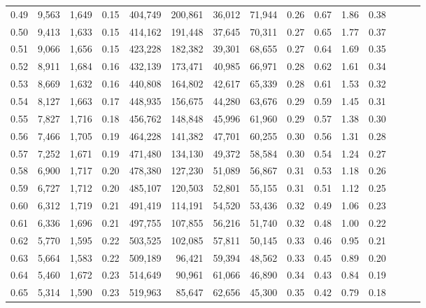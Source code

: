 \begin{tabular}{rrrrrrrrrrrrrrr}
0.49 &   9,563 &  1,649 &  0.15 &  404,749 &  200,861 &   36,012 &   71,944 &  0.26 &  0.67 &  1.86 &      0.38 \\
0.50 &   9,413 &  1,633 &  0.15 &  414,162 &  191,448 &   37,645 &   70,311 &  0.27 &  0.65 &  1.77 &      0.37 \\
0.51 &   9,066 &  1,656 &  0.15 &  423,228 &  182,382 &   39,301 &   68,655 &  0.27 &  0.64 &  1.69 &      0.35 \\
0.52 &   8,911 &  1,684 &  0.16 &  432,139 &  173,471 &   40,985 &   66,971 &  0.28 &  0.62 &  1.61 &      0.34 \\
0.53 &   8,669 &  1,632 &  0.16 &  440,808 &  164,802 &   42,617 &   65,339 &  0.28 &  0.61 &  1.53 &      0.32 \\
0.54 &   8,127 &  1,663 &  0.17 &  448,935 &  156,675 &   44,280 &   63,676 &  0.29 &  0.59 &  1.45 &      0.31 \\
0.55 &   7,827 &  1,716 &  0.18 &  456,762 &  148,848 &   45,996 &   61,960 &  0.29 &  0.57 &  1.38 &      0.30 \\
0.56 &   7,466 &  1,705 &  0.19 &  464,228 &  141,382 &   47,701 &   60,255 &  0.30 &  0.56 &  1.31 &      0.28 \\
0.57 &   7,252 &  1,671 &  0.19 &  471,480 &  134,130 &   49,372 &   58,584 &  0.30 &  0.54 &  1.24 &      0.27 \\
0.58 &   6,900 &  1,717 &  0.20 &  478,380 &  127,230 &   51,089 &   56,867 &  0.31 &  0.53 &  1.18 &      0.26 \\
0.59 &   6,727 &  1,712 &  0.20 &  485,107 &  120,503 &   52,801 &   55,155 &  0.31 &  0.51 &  1.12 &      0.25 \\
0.60 &   6,312 &  1,719 &  0.21 &  491,419 &  114,191 &   54,520 &   53,436 &  0.32 &  0.49 &  1.06 &      0.23 \\
0.61 &   6,336 &  1,696 &  0.21 &  497,755 &  107,855 &   56,216 &   51,740 &  0.32 &  0.48 &  1.00 &      0.22 \\
0.62 &   5,770 &  1,595 &  0.22 &  503,525 &  102,085 &   57,811 &   50,145 &  0.33 &  0.46 &  0.95 &      0.21 \\
0.63 &   5,664 &  1,583 &  0.22 &  509,189 &   96,421 &   59,394 &   48,562 &  0.33 &  0.45 &  0.89 &      0.20 \\
0.64 &   5,460 &  1,672 &  0.23 &  514,649 &   90,961 &   61,066 &   46,890 &  0.34 &  0.43 &  0.84 &      0.19 \\
0.65 &   5,314 &  1,590 &  0.23 &  519,963 &   85,647 &   62,656 &   45,300 &  0.35 &  0.42 &  0.79 &      0.18 \\

\end{tabular}
